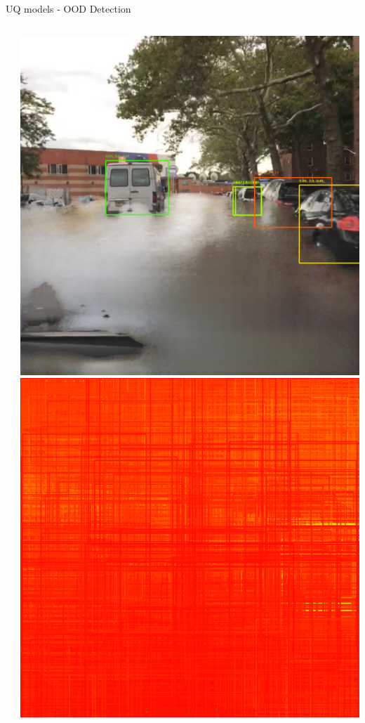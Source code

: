 \documentclass[10pt, aspectratio=169]{beamer}
\begin{document}
\begin{frame}[allowframebreaks]{UQ models - OOD Detection}
\begin{columns}
\begin{column}{.2\textwidth}
            \end{column}
            \begin{column}{.2\textwidth}
                \includegraphics[width=\textwidth]{images/uq_weathers/BNN_variances1.png}
                \includegraphics[width=\textwidth]{images/uq_weathers/flipout_entropies_all1.png}

\end{column}
\end{columns}
\end{frame}
\end{document}
